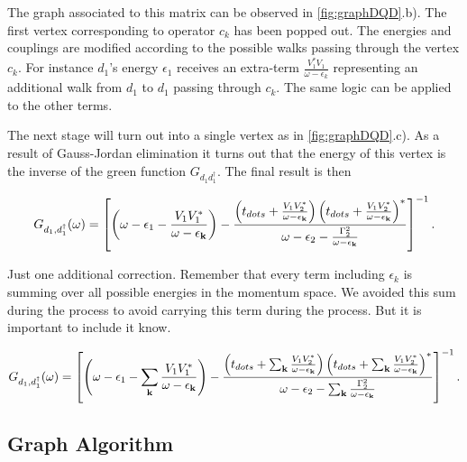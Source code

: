 The graph associated to this matrix can be observed in \ref{fig:graphDQD}.b). The first vertex corresponding to operator $c_k$ has been popped out. The energies and couplings are modified according to the possible walks passing through the vertex $c_k$.  For instance $d_1$'s energy $\epsilon_1$ receives an extra-term $\frac{V_{1}^{*}V_{1}}{\omega-\epsilon_{k}}$ representing an additional walk  from $d_1$ to $d_1$ passing through  $c_k$. The same logic can be applied to the other terms.  

The next  stage will turn out into a single vertex as in \ref{fig:graphDQD}.c). As a result of Gauss-Jordan elimination it turns out that the energy of this vertex is the inverse of the green function $G_{d_1d^\dagger_1}$. The final result is then 

\begin{equation}
    G_{d_{1},d_{1}^{\dagger}}(\omega)=\left[\left(\omega-\epsilon_{1}-\frac{V_{1}V_{1}^{*}}{\omega-\epsilon_{\mathbf{k}}}\right)-\frac{\left(t_{dots}+\frac{V_{1}V_{2}^{*}}{\omega-\epsilon_{\mathbf{k}}}\right)\left(t_{dots}+\frac{V_{1}V_{2}^{*}}{\omega-\epsilon_{\mathbf{k}}}\right)^{*}}{\omega-\epsilon_{2}-\frac{\Gamma_{2}^{2}}{\omega-\epsilon_{\mathbf{k}}}}\right]^{-1}. \label{eq:solGreen}
\end{equation}

Just one additional correction. Remember that every term including $\epsilon_k$ is summing over all possible energies in the momentum space. We avoided this sum during the process to avoid carrying this term during the process. But it is important to include it know.  

\begin{equation}
     G_{d_{1},d_{1}^{\dagger}}(\omega)=\left[\left(\omega-\epsilon_{1}-\sum_{\mathbf{k}}\frac{V_{1}V_{1}^{*}}{\omega-\epsilon_{\mathbf{k}}}\right)-\frac{\left(t_{dots}+\sum_{\mathbf{k}}\frac{V_{1}V_{2}^{*}}{\omega-\epsilon_{\mathbf{k}}}\right)\left(t_{dots}+\sum_{\mathbf{k}}\frac{V_{1}V_{2}^{*}}{\omega-\epsilon_{\mathbf{k}}}\right)^{*}}{\omega-\epsilon_{2}-\sum_{\mathbf{k}}\frac{\Gamma_{2}^{2}}{\omega-\epsilon_{\mathbf{k}}}}\right]^{-1}. \label{eq:SumSolGreen}
\end{equation}

\subsection{Graph Algorithm \label{sec:Algorithm}}

